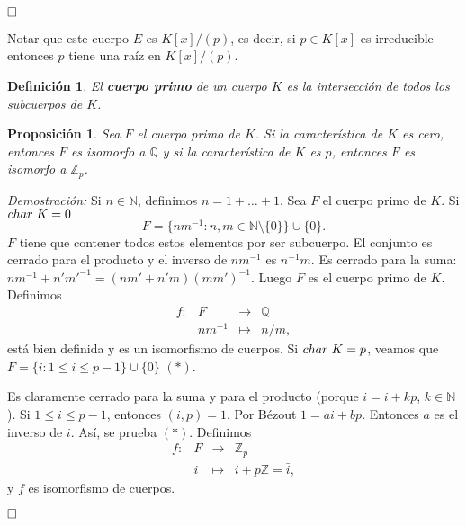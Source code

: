 \documentclass[12pt]{article}
\newtheorem{proposition}[theorem]{Proposición}
\newtheorem{definition}[theorem]{Definición}
\begin{document}
$\hfill \square$

Notar que este cuerpo $E$ es $K[x]/(p)$, es decir, si $p \in K[x]$ es irreducible entonces $p$ tiene una raíz en $K[x]/(p)$.

\begin{definition}El \textbf{cuerpo primo} de un cuerpo $K$ es la intersección de todos los subcuerpos de $K$.
\end{definition}

\begin{proposition}\label{eq:cuerPri} Sea $F$ el cuerpo primo de $K$. Si la característica de $K$ es cero, entonces $F$ es isomorfo a $\mathbb{Q}$ y si la característica de $K$ es $p$, entonces $F$ es isomorfo a $\mathbb{Z}_p$.
\end{proposition}
\emph{Demostración: }Si $n \in \mathbb{N}$, definimos $n = 1+ \ldots + 1$. Sea $F$ el cuerpo primo de $K$. Si $char\hspace{0.1cm} K = 0$ $$F = \lbrace nm^{-1}: n,m \in \mathbb{N} \setminus \lbrace 0 \rbrace \rbrace \cup \lbrace 0 \rbrace.$$ $F$ tiene que contener todos estos elementos por ser subcuerpo. El conjunto es cerrado para el producto y el inverso de $nm^{-1}$ es $n^{-1}m$. Es cerrado para la suma: $nm^{-1}+n'm'^{-1} = (nm'+n'm)(mm')^{-1}.$ Luego $F$ es el cuerpo primo de $K$. Definimos $$\begin{array}{rccl}
f \colon &F&\longrightarrow &\mathbb{Q}\\
&nm^{-1}& \longmapsto &n/m,
\end{array}
$$ está bien definida y es un isomorfismo de cuerpos. Si $char\hspace{0.1cm} K = p$, veamos que $F = \lbrace i: 1 \leq i \leq p-1 \rbrace \cup \lbrace 0 \rbrace$ $(\ast)$.

Es claramente cerrado para la suma y para el producto (porque $i = i+kp$, $k \in \mathbb{N}$). Si $1 \leq i \leq p-1$, entonces $(i,p)=1$. Por Bézout $1 = ai + bp$. Entonces $a$ es el inverso de $i$. Así, se prueba $(\ast)$. Definimos $$\begin{array}{rccl}
f \colon &F&\longrightarrow &\mathbb{Z}_p\\
&i& \longmapsto &i+p\mathbb{Z} = \bar{i},
\end{array}
$$ y $f$ es isomorfismo de cuerpos.

$\hfill \square$
\end{document}
